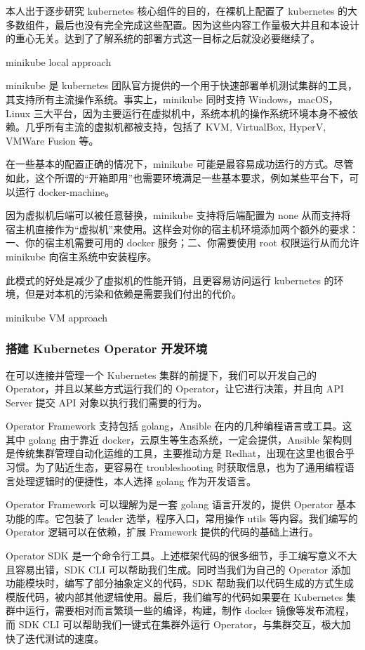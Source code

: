 本人出于逐步研究 kubernetes 核心组件的目的，在裸机上配置了 kubernetes 的大多数组件，最后也没有完全完成这些配置。因为这些内容工作量极大并且和本设计的重心无关。达到了了解系统的部署方式这一目标之后就没必要继续了。


minikube local approach

minikube 是 kubernetes 团队官方提供的一个用于快速部署单机测试集群的工具，其支持所有主流操作系统。事实上，minikube 同时支持 Windows，macOS，Linux 三大平台，因为主要运行在虚拟机中，系统本机的操作系统环境本身不被依赖。几乎所有主流的虚拟机都被支持，包括了 KVM, VirtualBox, HyperV, VMWare Fusion 等。

在一些基本的配置正确的情况下，minikube 可能是最容易成功运行的方式。尽管如此，这个所谓的“开箱即用”也需要环境满足一些基本要求，例如某些平台下，可以运行 docker-machine。

因为虚拟机后端可以被任意替换，minikube 支持将后端配置为 none 从而支持将宿主机直接作为“虚拟机”来使用。这样会对你的宿主机环境添加两个额外的要求：一、你的宿主机需要可用的 docker 服务；二、你需要使用 root 权限运行从而允许 minikube 向宿主系统中安装程序。

此模式的好处是减少了虚拟机的性能开销，且更容易访问运行 kubernetes 的环境，但是对本机的污染和依赖是需要我们付出的代价。

minikube VM approach


\subsubsection{搭建 Kubernetes Operator 开发环境}

在可以连接并管理一个 Kubernetes 集群的前提下，我们可以开发自己的 Operator，并且以某些方式运行我们的 Operator，让它进行决策，并且向 API Server 提交 API 对象以执行我们需要的行为。

Operator Framework 支持包括 golang，Ansible 在内的几种编程语言或工具。这其中 golang 由于靠近 docker，云原生等生态系统，一定会提供，Ansible 架构则是传统集群管理自动化运维的工具，主要推动方是 Redhat，出现在这里也很合乎习惯。为了贴近生态，更容易在 troubleshooting 时获取信息，也为了通用编程语言处理逻辑时的便捷性，本人选择 golang 作为开发语言。

Operator Framework 可以理解为是一套 golang 语言开发的，提供 Operator 基本功能的库。它包装了 leader 选举，程序入口，常用操作 utils 等内容。我们编写的 Operator 逻辑可以在依赖，扩展 Framework 提供的代码的基础上进行。

Operator SDK 是一个命令行工具。上述框架代码的很多细节，手工编写意义不大且容易出错，SDK CLI 可以帮助我们生成。同时当我们为自己的 Operator 添加功能模块时，编写了部分抽象定义的代码，SDK 帮助我们以代码生成的方式生成模版代码，被内部其他逻辑使用。最后，我们编写的代码如果要在 Kubernetes 集群中运行，需要相对而言繁琐一些的编译，构建，制作 docker 镜像等发布流程，而 SDK CLI 可以帮助我们一键式在集群外运行 Operator，与集群交互，极大加快了迭代测试的速度。

